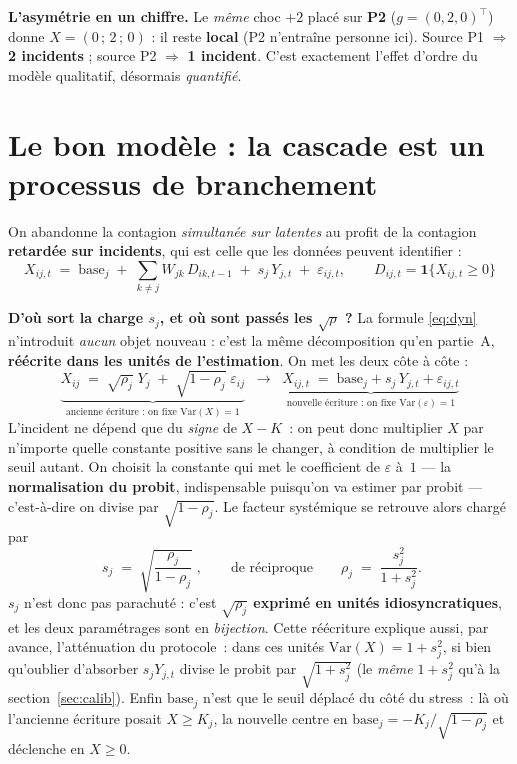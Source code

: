 \documentclass[11pt,a4paper]{article}
\newcommand{\Y}{Y}
\newcommand{\eps}{\varepsilon}
\begin{document}
\begin{cle}
\textbf{L'asymétrie en un chiffre.} Le \emph{même} choc $+2$ placé sur \textbf{P2}
($g=(0,2,0)^\top$) donne $X=(0\,;\,2\,;\,0)$ : il reste \textbf{local} (P2 n'entraîne personne
ici). Source P1 $\Rightarrow$ \textbf{2 incidents} ; source P2 $\Rightarrow$ \textbf{1 incident}.
C'est exactement l'effet d'ordre du modèle qualitatif, désormais \emph{quantifié}.
\end{cle}

\section{Le bon modèle : la cascade est un processus de branchement}
\label{sec:branch}

On abandonne la contagion \emph{simultanée sur latentes} au profit de la contagion
\textbf{retardée sur incidents}, qui est celle que les données peuvent identifier :
\begin{equation}
\label{eq:dyn}
\boxed{\;X_{ij,t} \;=\; \text{base}_j \;+\; \sum_{k\neq j} W_{jk}\,D_{ik,t-1}
  \;+\; s_j\,\Y_{j,t} \;+\; \eps_{ij,t}, \qquad D_{ij,t} = \mathbf 1\{X_{ij,t} \ge 0\}\;}
\end{equation}

\begin{cle}
\textbf{D'où sort la charge $s_j$, et où sont passés les $\sqrt{\rho}$ ?} La formule
\eqref{eq:dyn} n'introduit \emph{aucun} objet nouveau : c'est la même décomposition qu'en
partie~A, \textbf{réécrite dans les unités de l'estimation}. On met les deux côte à côte :
\[
\underbrace{X_{ij} \;=\; \sqrt{\rho_j}\;\Y_j \;+\; \sqrt{1-\rho_j}\;\eps_{ij}}_{\text{ancienne écriture : on fixe } \mathrm{Var}(X)=1}
\;\;\longrightarrow\;\;
\underbrace{X_{ij,t} \;=\; \text{base}_j + s_j\,\Y_{j,t} + \eps_{ij,t}}_{\text{nouvelle écriture : on fixe } \mathrm{Var}(\eps)=1}
\]
L'incident ne dépend que du \emph{signe} de $X-K$~: on peut donc multiplier $X$ par n'importe
quelle constante positive sans le changer, à condition de multiplier le seuil autant. On
choisit la constante qui met le coefficient de $\eps$ à~$1$ --- la \textbf{normalisation du
probit}, indispensable puisqu'on va estimer par probit --- c'est-à-dire on divise par
$\sqrt{1-\rho_j}$. Le facteur systémique se retrouve alors chargé par
\[
\boxed{\;s_j \;=\; \sqrt{\dfrac{\rho_j}{1-\rho_j}}\;}, \qquad\text{de réciproque}\qquad
\rho_j \;=\; \dfrac{s_j^2}{1+s_j^2}.
\]
$s_j$ n'est donc pas parachuté : c'est \textbf{$\sqrt{\rho_j}$ exprimé en unités
idiosyncratiques}, et les deux paramétrages sont en \emph{bijection}. Cette réécriture
explique aussi, par avance, l'atténuation du protocole~: dans ces unités
$\mathrm{Var}(X)=1+s_j^2$, si bien qu'oublier d'absorber $s_j\Y_{j,t}$ divise le probit par
$\sqrt{1+s_j^2}$ (le \emph{même} $1+s_j^2$ qu'à la section~\ref{sec:calib}). Enfin
$\text{base}_j$ n'est que le seuil déplacé du côté du stress~: là où l'ancienne écriture posait
$X\ge K_j$, la nouvelle centre en $\text{base}_j = -K_j/\sqrt{1-\rho_j}$ et déclenche en
$X\ge 0$.
\end{cle}
\end{document}
